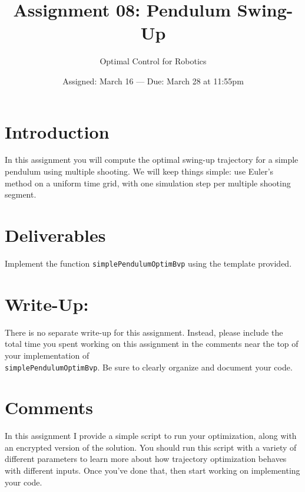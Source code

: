 

\title{Assignment 08:  Pendulum Swing-Up}
\date{Assigned:  March 16  ---  Due:  March 28 at 11:55pm}
\author{Optimal Control for Robotics}

\maketitle

\section*{Introduction}

In this assignment you will compute the optimal swing-up trajectory for a simple
pendulum using multiple shooting. We will keep things simple:
use Euler's method on a uniform time grid,
with one simulation step per multiple shooting segment.

\section*{Deliverables}

Implement the function \texttt{simplePendulumOptimBvp} using the template provided.

\section*{Write-Up:}

There is no separate write-up for this assignment. Instead,
please include the total time you spent working on this assignment in
the comments near the top of your implementation of\\
\texttt{simplePendulumOptimBvp}.
Be sure to clearly organize and document your code.

\section*{Comments}

In this assignment I provide a simple script to run your optimization,
along with an encrypted version of the solution.
You should run this script with a variety of different parameters to learn
more about how trajectory optimization behaves with different inputs.
Once you've done that, then start working on implementing your code.

